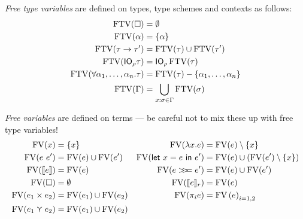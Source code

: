 \emph{Free type variables} are defined on types, type schemes and contexts as
follows:
\begin{align*}
  \operatorname{FTV}(\square) &= \emptyset \\
  \operatorname{FTV}(\alpha) &= \{ \alpha \} \\
  \operatorname{FTV}(\tau \rightarrow \tau') &= \operatorname{FTV}(\tau) \cup \operatorname{FTV}(\tau') \\
  \operatorname{FTV}(\mathsf{IO}_\rho \tau) &= \mathsf{IO}_\rho \operatorname{FTV}(\tau) \\
  \operatorname{FTV}(\forall \alpha_1 , \ldots , \alpha_n . \tau) &= \operatorname{FTV}(\tau) - \{ \alpha_1 , \ldots, \alpha_n \} \\
  \operatorname{FTV}(\Gamma) &= \bigcup_{x : \sigma \in \Gamma} \operatorname{FTV}(\sigma)
\end{align*}
\begin{samepage}
\emph{Free variables} are defined on terms --- be careful not to mix these up
with free type variables!
\[
\begin{aligned}
  \fv(x) &= \{ x \} & \fv(\lambda x . e) &= \fv(e) \setminus \{ x \} \\
  \fv(e \ e') &= \fv(e) \cup \fv(e') & \fv(\letin{x = e}{e'}) &= \fv(e) \cup
                                    (\fv(e') \setminus \{ x \}) \\
  \fv(\lift{e}) &= \fv(e) & \fv(e \bind e') &= \fv(e) \cup \fv(e') \\
  \fv(\square) &= \emptyset & \fv(\use{r}{e}) &= \fv(e) \\
  \fv(e_1 \times e_2) &= \fv(e_1) \cup \fv(e_2) & \fv(\pi_i e) &= \fv{(e)}_{i = 1,
                                          2} \\
  \fv(e_1 \curlyvee e_2) &= \fv(e_1) \cup \fv(e_2)
\end{aligned}
\]
\end{samepage}

